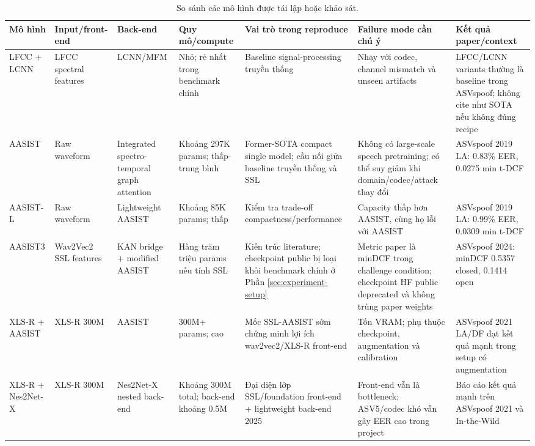 \begin{table}[H]
    \centering
    \footnotesize
    \begin{adjustbox}{width=\textwidth}
    \begin{tabular}{p{2.5cm}|p{2.7cm}|p{2.6cm}|p{2.4cm}|p{3.7cm}|p{3.7cm}|p{3.5cm}}
        \textbf{Mô hình} & \textbf{Input/front-end} & \textbf{Back-end} & \textbf{Quy mô/compute} & \textbf{Vai trò trong reproduce} & \textbf{Failure mode cần chú ý} & \textbf{Kết quả paper/context}
        \\ \hline
        LFCC + LCNN & LFCC spectral features & LCNN/MFM & Nhỏ; rẻ nhất trong benchmark chính & Baseline signal-processing truyền thống & Nhạy với codec, channel mismatch và unseen artifacts & LFCC/LCNN variants thường là baseline trong ASVspoof; không cite như SOTA nếu không đúng recipe
        \\ \hline
        AASIST & Raw waveform & Integrated spectro-temporal graph attention & Khoảng 297K params; thấp-trung bình & Former-SOTA compact single model; cầu nối giữa baseline truyền thống và SSL & Không có large-scale speech pretraining; có thể suy giảm khi domain/codec/attack thay đổi & ASVspoof 2019 LA: 0.83\% EER, 0.0275 min t-DCF \cite{aasist}
        \\ \hline
        AASIST-L & Raw waveform & Lightweight AASIST & Khoảng 85K params; thấp & Kiểm tra trade-off compactness/performance & Capacity thấp hơn AASIST, cùng họ lỗi với AASIST & ASVspoof 2019 LA: 0.99\% EER, 0.0309 min t-DCF \cite{aasist}
        \\ \hline
        AASIST3 & Wav2Vec2 SSL features & KAN bridge + modified AASIST & Hàng trăm triệu params nếu tính SSL & Kiến trúc literature; checkpoint public bị loại khỏi benchmark chính ở Phần \ref{sec:experiment-setup} & Metric paper là minDCF trong challenge condition; checkpoint HF public deprecated và không trùng paper weights & ASVspoof 2024: minDCF 0.5357 closed, 0.1414 open \cite{aasist3,aasist3_hf}
        \\ \hline
        XLS-R + AASIST & XLS-R 300M & AASIST & 300M+ params; cao & Mốc SSL-AASIST sớm chứng minh lợi ích wav2vec2/XLS-R front-end & Tốn VRAM; phụ thuộc checkpoint, augmentation và calibration & ASVspoof 2021 LA/DF đạt kết quả mạnh trong setup có augmentation \cite{ssl_aasist}
        \\ \hline
        XLS-R + Nes2Net-X & XLS-R 300M & Nes2Net-X nested back-end & Khoảng 300M total; back-end khoảng 0.5M & Đại diện lớp SSL/foundation front-end + lightweight back-end 2025 & Front-end vẫn là bottleneck; ASV5/codec khó vẫn gây EER cao trong project & Báo cáo kết quả mạnh trên ASVspoof 2021 và In-the-Wild \cite{nes2net}
    \end{tabular}
    \end{adjustbox}
    \caption{So sánh các mô hình được tái lập hoặc khảo sát.}
    \label{tab:reproduced-models}
\end{table}

